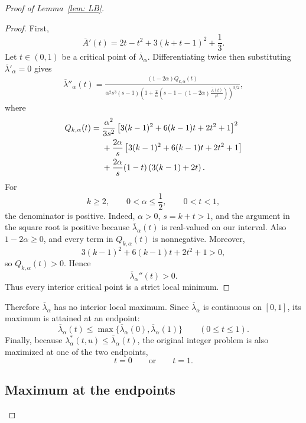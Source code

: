 \documentclass[%
english, titlepage=false %
]{./tum-templates/book/tumbook}
\begin{document}
\begin{proof}[\hypertarget{proof:LB}{Proof of Lemma~\ref{lem: LB}}]
\begin{proof}
First,
\[
        \overline A'(t)
        =
        2t-t^2+3(k+t-1)^2+\frac13.
\]
Let \(t\in(0,1)\) be a critical point of \(\overline \lambda_{\alpha}\). Differentiating twice then substituting
\(\overline \lambda'_{\alpha}=0\) gives
\begin{align}
        \overline \lambda''_{\alpha}(t)
        =
        \frac{
        (1-2\alpha)Q_{k,\alpha}(t)
        }{
        \alpha^2s^3(s-1)
        \left(
        1+\frac{2}{\alpha}
        \left(
        s-1-(1-2\alpha)\frac{\overline A(t)}{s^2}
        \right)
        \right)^{3/2}
        },
    \label{Wolfram5}
\end{align}
where
\begin{align}
\label{Wolfram6}
Q_{k,\alpha}(t)
={}&
\frac{\alpha^2}{3s^2}
\left[
3(k-1)^2+6(k-1)t+2t^2+1
\right]^2                                     \\
&+
\frac{2\alpha}{s}
\left[
3(k-1)^2+6(k-1)t+2t^2+1
\right]  \notag                                    \\
&+
\frac{2\alpha}{s}
(1-t)\left(3(k-1)+2t\right) \notag.
\end{align}
For
\[
        k\geq 2,\qquad 0<\alpha\leq \frac12,\qquad 0<t<1,
\]
the denominator is positive. Indeed, \(\alpha>0\), \(s=k+t>1\), and the
argument in the square root is positive because \(\overline \lambda_{\alpha}(t)\) is
real-valued on our interval. Also \(1-2\alpha\geq 0\), and
every term in \(Q_{k,\alpha}(t)\) is nonnegative. Moreover,
\[
        3(k-1)^2+6(k-1)t+2t^2+1>0,
\]
so \(Q_{k,\alpha}(t)>0\). Hence
\[
        \overline \lambda_{\alpha}''(t)>0.
\]
Thus every interior critical point is a strict local minimum.
\end{proof}

Therefore \(\overline \lambda_{\alpha}\) has no interior local maximum. Since
\(\overline \lambda_{\alpha}\) is continuous on \([0,1]\), its maximum is attained at an
endpoint:
\[
        \overline \lambda_{\alpha}(t)
        \leq
        \max\{\overline \lambda_{\alpha}(0),\overline \lambda_{\alpha}(1)\}
        \qquad (0\leq t\leq 1).
\]
Finally, because \(\lambda_{\alpha}^*(t,u)\leq \overline \lambda_{\alpha}(t)\), the original integer
problem is also maximized at one of the two endpoints,
\[
        t=0
        \qquad\text{or}\qquad
        t=1.
\]

\subsection*{Maximum at the endpoints}


\end{proof}
\end{document}
